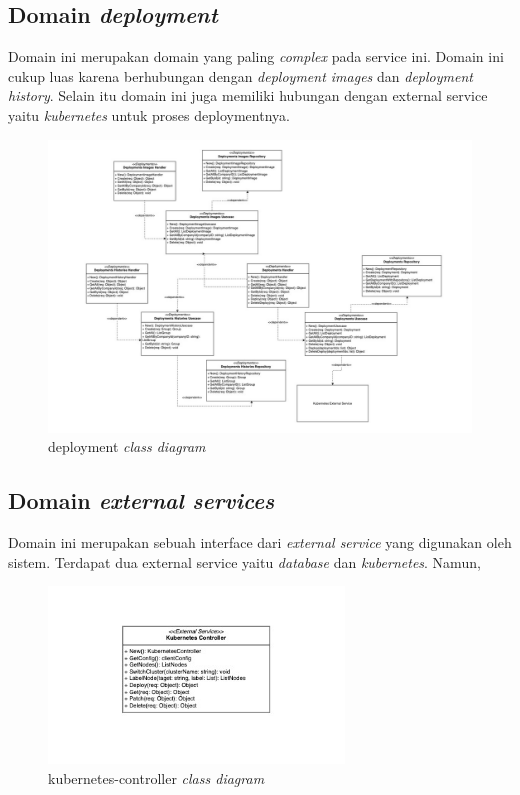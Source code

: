 \pagebreak

\subsection{Domain \textit{deployment}}

Domain ini merupakan domain yang paling \textit{complex} pada service ini. Domain ini cukup luas karena berhubungan dengan \textit{deployment images} dan \textit{deployment history}. Selain itu domain ini juga memiliki hubungan dengan external service yaitu \textit{kubernetes} untuk proses deploymentnya.

\begin{figure}[ht]
  \centering
  \includegraphics[width=1\textwidth]{resources/chapter-3/class/deployment-class-diagram.jpg}
  \caption{deployment \textit{class diagram}}
  \label{fig:deployment-class-diagram}
\end{figure}

\subsection{Domain \textit{external services}}

Domain ini merupakan sebuah interface dari \textit{external service} yang digunakan oleh sistem. Terdapat dua external service yaitu \textit{database} dan \textit{kubernetes}. Namun,

\begin{figure}[ht]
  \centering
  \includegraphics[width=0.7\textwidth]{resources/chapter-3/class/kubernetes-controller}
  \caption{kubernetes-controller \textit{class diagram}}
  \label{fig:kubernetes-controller-class-diagram}
\end{figure}